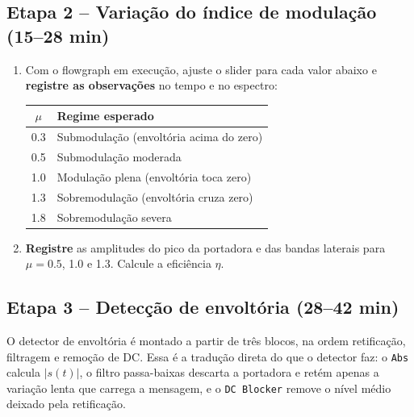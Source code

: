 \documentclass[11pt,a4paper]{article}
\begin{document}
\subsection*{Etapa 2 -- Variação do índice de modulação (15--28 min)}

\begin{instrucao}
\begin{enumerate}[label=\arabic*.]
  \item Com o flowgraph em execução, ajuste o slider para cada valor abaixo e
    \textbf{registre as observações} no tempo e no espectro:

    \begin{center}
    \begin{tabular}{c l}
      \toprule
      $\mu$ & Regime esperado \\
      \midrule
      0.3 & Submodulação (envoltória acima do zero) \\
      0.5 & Submodulação moderada \\
      1.0 & Modulação plena (envoltória toca zero) \\
      1.3 & Sobremodulação (envoltória cruza zero) \\
      1.8 & Sobremodulação severa \\
      \bottomrule
    \end{tabular}
    \end{center}

  \item \textbf{Registre} as amplitudes do pico da portadora e das bandas
    laterais para $\mu = 0.5$, 1.0 e 1.3. Calcule a eficiência $\eta$.
\end{enumerate}
\end{instrucao}

\subsection*{Etapa 3 -- Detecção de envoltória (28--42 min)}

O detector de envoltória é montado a partir de três blocos, na ordem
retificação, filtragem e remoção de DC. Essa é a tradução direta do que o
detector faz: o \texttt{Abs} calcula $|s(t)|$, o filtro passa-baixas descarta
a portadora e retém apenas a variação lenta que carrega a mensagem, e o
\texttt{DC Blocker} remove o nível médio deixado pela retificação.
\end{document}
